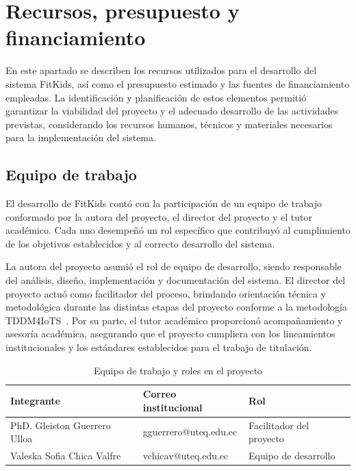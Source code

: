 		\section{Recursos, presupuesto y financiamiento}
			En este apartado se describen los recursos utilizados para el desarrollo del sistema FitKids, así como el presupuesto estimado y las fuentes de financiamiento empleadas. La identificación y planificación de estos elementos permitió garantizar la viabilidad del proyecto y el adecuado desarrollo de las actividades previstas, considerando los recursos humanos, técnicos y materiales necesarios para la implementación del sistema.
			
			\subsection{Equipo de trabajo}
				El desarrollo de FitKids contó con la participación de un equipo de trabajo conformado por la autora del proyecto, el director del proyecto y el tutor académico. Cada uno desempeñó un rol específico que contribuyó al cumplimiento de los objetivos establecidos y al correcto desarrollo del sistema.
				
				La autora del proyecto asumió el rol de equipo de desarrollo, siendo responsable del análisis, diseño, implementación y documentación del sistema. El director del proyecto actuó como facilitador del proceso, brindando orientación técnica y metodológica durante las distintas etapas del proyecto conforme a la metodología TDDM4IoTS~\cite{GuerreroUlloa2024}. Por su parte, el tutor académico proporcionó acompañamiento y asesoría académica, asegurando que el proyecto cumpliera con los lineamientos institucionales y los estándares establecidos para el trabajo de titulación.
				
				\begin{table}[H]
					\centering
					\small
					\caption{Equipo de trabajo y roles en el proyecto}
					\label{tab:equipo}
					\begin{tabular}{p{4.7cm}p{4.7cm}p{4.7cm}}
						\hline
						\textbf{Integrante} & \textbf{Correo institucional} & \textbf{Rol} \\
						\hline
						PhD. Gleiston Guerrero Ulloa & gguerrero@uteq.edu.ec & Facilitador del proyecto \\
						
						Valeska Sofia Chica Valfre & vchicav@uteq.edu.ec & Equipo de desarrollo \\
						\hline
					\end{tabular}
				\end{table}
				\tblnote
			
